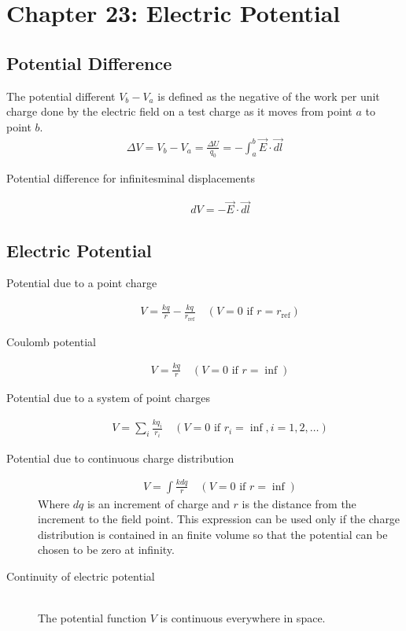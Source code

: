 \documentclass[../main.tex]{subfiles}
\begin{document}
\section{Chapter 23: Electric Potential}
\label{sec:chapter_23_electric_potential}

\subsection{Potential Difference}
\label{sub:potential_difference}

The potential different $V_b - V_a$ is defined as the negative of the work per
unit charge done by the electric field on a test charge as it moves from point
$a$ to point $b$.
\begin{align}
  \Delta V = V_b - V_a = \frac{\Delta U}{q_0} = -\int_a^b\vec{E}\cdot\vec{dl}
\end{align}

\begin{description}
  \item[Potential difference for infinitesminal displacements]
    \begin{align}
      dV = -\vec{E} \cdot \vec{dl}
    \end{align}
\end{description}

\subsection{Electric Potential}
\label{sub:electric_potential}

\begin{description}
  \item[Potential due to a point charge]
    \begin{align}
      V = \frac{kq}{r}-\frac{kq}{r_{\text{ref}}}\quad (V = 0
      \text{ if }r=r_{\text{ref}})
    \end{align}
  \item[Coulomb potential]
    \begin{align}
      V = \frac{kq}{r}\quad(V = 0 \text{ if  } r = \inf)
    \end{align}
  \item[Potential due to a system of point charges]
    \begin{align}
      V = \sum_i\frac{kq_i}{r_i}\quad(V=0 \text{ if } r_i = \inf, i=1,2,\ldots)
    \end{align}
  \item[Potential due to continuous charge distribution]
    \begin{align}
      V = \int{\frac{kdq}{r}}\quad(V=0\text{ if }r=\inf)
    \end{align}
    Where $dq$ is an increment of charge and $r$ is the distance from the
    increment to the field point. This expression can be used only if the
    charge distribution is contained in an finite volume so that the potential
    can be chosen to be zero at infinity.
  \item[Continuity of electric potential] \hfill \\
    The potential function $V$ is continuous everywhere in space.
\end{description}
\end{document}
